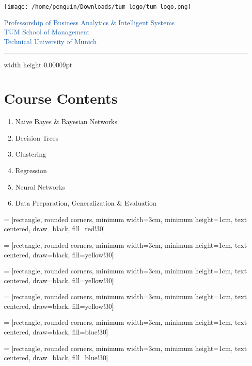\documentclass{article}
\begin{document}
\begin{flushright}
    \texttt{[image: /home/penguin/Downloads/tum-logo/tum-logo.png]} \\
\end{flushright}
\vspace{-1.7cm}
\noindent
\large 
\textcolor[HTML]{165DB1}{Professorship of Business Analytics \& Intelligent Systems\\ TUM School of Management\\
Technical University of Munich}
\vspace{5mm}
\noindent\hrule width \textwidth height 0.00009pt \relax
\normalsize
\vspace{10mm}
\section*{Course Contents}
\begin{enumerate}
    \item Naive Bayes \& Bayesian Networks
    \item Decision Trees
    \item Clustering
    \item Regression
    \item Neural Networks
    \item Data Preparation, Generalization \& Evaluation
\end{enumerate}

\vspace{10mm}

 = [rectangle, rounded corners,
minimum width=3cm,
minimum height=1cm,
text centered,
draw=black,
fill=red!30]

 = [rectangle, rounded corners,
minimum width=3cm,
minimum height=1cm,
text centered,
draw=black,
fill=yellow!30]

 = [rectangle, rounded corners,
minimum width=3cm,
minimum height=1cm,
text centered,
draw=black,
fill=yellow!30]

 = [rectangle, rounded corners,
minimum width=3cm,
minimum height=1cm,
text centered,
draw=black,
fill=yellow!30]

 = [rectangle, rounded corners,
minimum width=3cm,
minimum height=1cm,
text centered,
draw=black,
fill=blue!30]

 = [rectangle, rounded corners,
minimum width=3cm,
minimum height=1cm,
text centered,
draw=black,
fill=blue!30]
\end{document}
